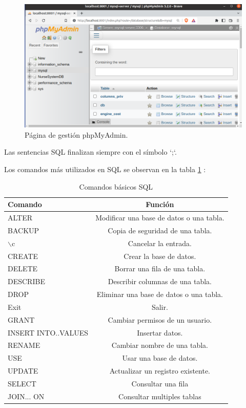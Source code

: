 \begin{figure}[ht]
	\centering
	\includegraphics[scale=.35]{./Figures/phpMyAdmin.png}
	\caption{Página de gestión phpMyAdmin.}
	\label{fig:Página phpMyAdmin}
\end{figure}


Las sentencias SQL finalizan siempre con el símbolo `;`.

Los comandos más utilizados en SQL se observan en la tabla \ref{tab:Funciones SQL} \citep{BOOK:2}:

\begin{table}[h]
	\centering
	\caption[Comandos SQL]{Comandos básicos SQL}
	\begin{tabular}{l c }    
		\toprule
		\textbf{Comando}     & \textbf{Función} \\
		\midrule
		ALTER & Modificar una base de datos o una tabla.    \\		
		BACKUP    & Copia de seguridad de una tabla.      \\
		$\backslash$c  & Cancelar la entrada.\\
		CREATE  & Crear la base de datos.\\
		DELETE  & Borrar una fila de una tabla.\\
		DESCRIBE  & Describir columnas de una tabla.\\
		DROP  & Eliminar una base de datos o una tabla.\\
		Exit & Salir.\\
		GRANT & Cambiar permisos de un usuario.\\
		INSERT INTO..VALUES & Insertar datos.\\
		RENAME & Cambiar nombre de una tabla.\\
		USE & Usar una base de datos.\\
		UPDATE & Actualizar un registro existente.\\
		SELECT  & Consultar una fila\\
		JOIN... ON & Consultar multiples tablas\\
		\bottomrule
		\hline
	\end{tabular}
	\label{tab:Funciones SQL}
\end{table}

